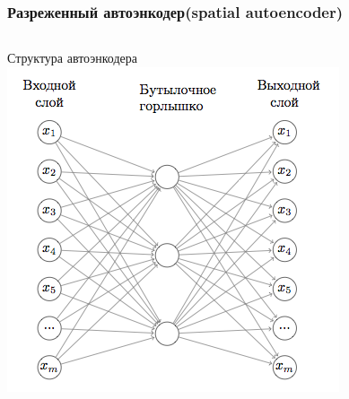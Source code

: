 \documentclass{beamer}
\begin{document}
\begin{frame}
\frametitle{Разреженный автоэнкодер(spatial autoencoder)}
\begin{columns}[T]
    \begin{column}{.5\textwidth}
    \begin{block}{Структура автоэнкодера}
    \includegraphics[width=\linewidth,height=.7\textheight,keepaspectratio]{autoencoder.png}
    \end{block}
    \end{column}
  \end{columns}
\end{frame}
\end{document}
